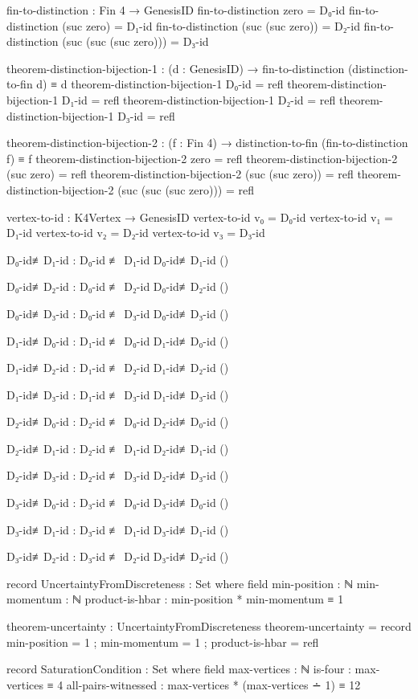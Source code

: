 \documentclass[11pt,a4paper]{book}
\begin{document}
\begin{code}
fin-to-distinction : Fin 4 → GenesisID
fin-to-distinction zero = D₀-id
fin-to-distinction (suc zero) = D₁-id
fin-to-distinction (suc (suc zero)) = D₂-id
fin-to-distinction (suc (suc (suc zero))) = D₃-id

theorem-distinction-bijection-1 : (d : GenesisID) → fin-to-distinction (distinction-to-fin d) ≡ d
theorem-distinction-bijection-1 D₀-id = refl
theorem-distinction-bijection-1 D₁-id = refl
theorem-distinction-bijection-1 D₂-id = refl
theorem-distinction-bijection-1 D₃-id = refl

theorem-distinction-bijection-2 : (f : Fin 4) → distinction-to-fin (fin-to-distinction f) ≡ f
theorem-distinction-bijection-2 zero = refl
theorem-distinction-bijection-2 (suc zero) = refl
theorem-distinction-bijection-2 (suc (suc zero)) = refl
theorem-distinction-bijection-2 (suc (suc (suc zero))) = refl

vertex-to-id : K4Vertex → GenesisID
vertex-to-id v₀ = D₀-id
vertex-to-id v₁ = D₁-id
vertex-to-id v₂ = D₂-id
vertex-to-id v₃ = D₃-id

D₀-id≢D₁-id : D₀-id ≢ D₁-id
D₀-id≢D₁-id ()

D₀-id≢D₂-id : D₀-id ≢ D₂-id
D₀-id≢D₂-id ()

D₀-id≢D₃-id : D₀-id ≢ D₃-id
D₀-id≢D₃-id ()

D₁-id≢D₀-id : D₁-id ≢ D₀-id
D₁-id≢D₀-id ()

D₁-id≢D₂-id : D₁-id ≢ D₂-id
D₁-id≢D₂-id ()

D₁-id≢D₃-id : D₁-id ≢ D₃-id
D₁-id≢D₃-id ()

D₂-id≢D₀-id : D₂-id ≢ D₀-id
D₂-id≢D₀-id ()

D₂-id≢D₁-id : D₂-id ≢ D₁-id
D₂-id≢D₁-id ()

D₂-id≢D₃-id : D₂-id ≢ D₃-id
D₂-id≢D₃-id ()

D₃-id≢D₀-id : D₃-id ≢ D₀-id
D₃-id≢D₀-id ()

D₃-id≢D₁-id : D₃-id ≢ D₁-id
D₃-id≢D₁-id ()

D₃-id≢D₂-id : D₃-id ≢ D₂-id
D₃-id≢D₂-id ()

record UncertaintyFromDiscreteness : Set where
  field
    min-position : ℕ
    min-momentum : ℕ
    product-is-hbar : min-position * min-momentum ≡ 1

theorem-uncertainty : UncertaintyFromDiscreteness
theorem-uncertainty = record
  { min-position = 1
  ; min-momentum = 1
  ; product-is-hbar = refl
  }

record SaturationCondition : Set where
  field
    max-vertices    : ℕ
    is-four         : max-vertices ≡ 4
    all-pairs-witnessed : max-vertices * (max-vertices ∸ 1) ≡ 12


\end{code}
\end{document}
